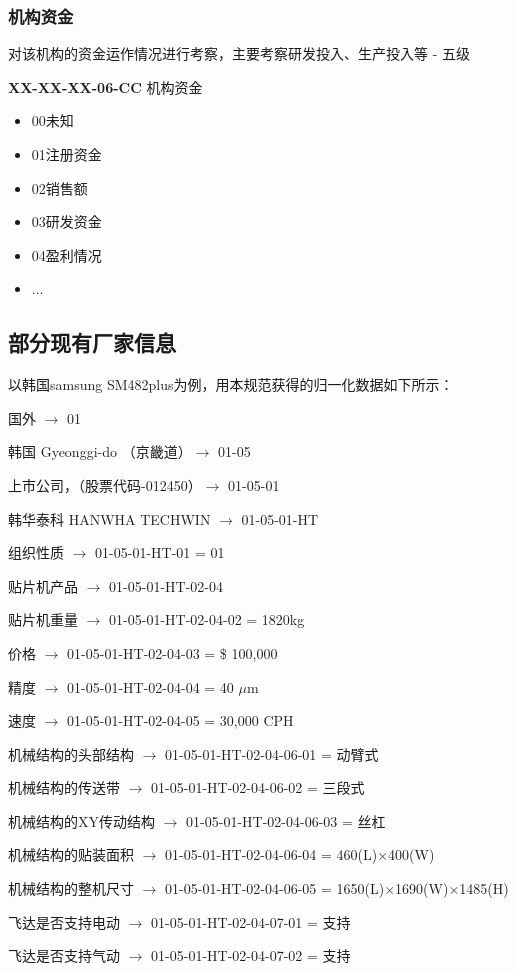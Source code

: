 \documentclass[a4paper,12pt,UTF8]{article}
\begin{document}
\subsubsection{机构资金}
对该机构的资金运作情况进行考察，主要考察研发投入、生产投入等 - 五级

\textbf{XX-XX-XX-06-CC} 机构资金
\begin{itemize}
  \item 00未知%
  \item 01注册资金
  \item 02销售额
  \item 03研发资金
  \item 04盈利情况
  \item ...
\end{itemize}

\subsection{部分现有厂家信息}

以韩国samsung SM482plus为例，用本规范获得的归一化数据如下所示：

国外 $\to$ 01

韩国 Gyeonggi-do （京畿道）$\to$ 01-05

上市公司，（股票代码-012450）$\to$ 01-05-01

韩华泰科 HANWHA TECHWIN $\to$ 01-05-01-HT

组织性质 $\to$ 01-05-01-HT-01 = 01

贴片机产品 $\to$ 01-05-01-HT-02-04

贴片机重量 $\to$ 01-05-01-HT-02-04-02 = 1820kg

价格 $\to$ 01-05-01-HT-02-04-03 = \$ 100,000

精度 $\to$ 01-05-01-HT-02-04-04 = 40 $\mu$m

速度 $\to$ 01-05-01-HT-02-04-05 = 30,000 CPH

机械结构的头部结构 $\to$ 01-05-01-HT-02-04-06-01 =  动臂式

机械结构的传送带 $\to$ 01-05-01-HT-02-04-06-02 =  三段式

机械结构的XY传动结构  $\to$ 01-05-01-HT-02-04-06-03 =  丝杠

机械结构的贴装面积  $\to$ 01-05-01-HT-02-04-06-04 =  460(L)$\times$400(W)

机械结构的整机尺寸  $\to$ 01-05-01-HT-02-04-06-05 =  1650(L)$\times$1690(W)$\times$1485(H)

飞达是否支持电动 $\to$ 01-05-01-HT-02-04-07-01 = 支持

飞达是否支持气动 $\to$ 01-05-01-HT-02-04-07-02 = 支持
\end{document}
